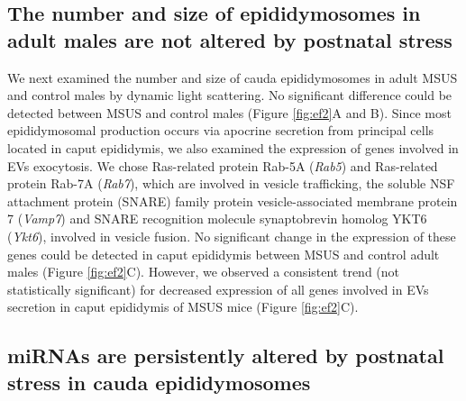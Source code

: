 \documentclass[12pt,twoside]{reedthesis}
\begin{document}
\hypertarget{the-number-and-size-of-epididymosomes-in-adult-males-are-not-altered-by-postnatal-stress}{%
\subsection{The number and size of epididymosomes in adult males are not altered by postnatal stress}\label{the-number-and-size-of-epididymosomes-in-adult-males-are-not-altered-by-postnatal-stress}}

We next examined the number and size of cauda epididymosomes in adult
MSUS and control males by dynamic light scattering. No significant
difference could be detected between MSUS and control males (Figure \ref{fig:ef2}A
and B). Since most epididymosomal production occurs via apocrine
secretion from principal cells located in caput epididymis, we also
examined the expression of genes involved in EVs exocytosis. We chose
Ras-related protein Rab-5A (\emph{Rab5}) and Ras-related protein Rab-7A
(\emph{Rab7}), which are involved in vesicle trafficking, the soluble NSF
attachment protein (SNARE) family protein vesicle-associated membrane
protein 7 (\emph{Vamp7}) and SNARE recognition molecule synaptobrevin homolog
YKT6 (\emph{Ykt6}), involved in vesicle fusion. No significant change in the
expression of these genes could be detected in caput epididymis between
MSUS and control adult males (Figure \ref{fig:ef2}C). However, we observed a
consistent trend (not statistically significant) for decreased
expression of all genes involved in EVs secretion in caput epididymis of
MSUS mice (Figure \ref{fig:ef2}C).

\hypertarget{mirnas-are-persistently-altered-by-postnatal-stress-in-cauda-epididymosomes}{%
\subsection{miRNAs are persistently altered by postnatal stress in cauda epididymosomes}\label{mirnas-are-persistently-altered-by-postnatal-stress-in-cauda-epididymosomes}}
\end{document}
